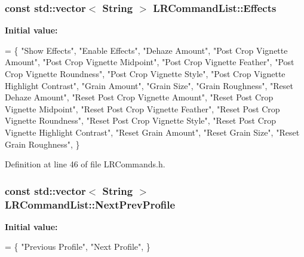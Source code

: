 \subsubsection[{\texorpdfstring{Effects}{Effects}}]{\setlength{\rightskip}{0pt plus 5cm}const std\+::vector$<$ String $>$ L\+R\+Command\+List\+::\+Effects\hspace{0.3cm}{\ttfamily [static]}}\hypertarget{class_l_r_command_list_a03a8a1a2c4063e93787410aef45838db}{}\label{class_l_r_command_list_a03a8a1a2c4063e93787410aef45838db}
{\bfseries Initial value\+:}
\begin{DoxyCode}
= \{
    \textcolor{stringliteral}{"Show Effects"},
    \textcolor{stringliteral}{"Enable Effects"},
    \textcolor{stringliteral}{"Dehaze Amount"},
    \textcolor{stringliteral}{"Post Crop Vignette Amount"},
    \textcolor{stringliteral}{"Post Crop Vignette Midpoint"},
    \textcolor{stringliteral}{"Post Crop Vignette Feather"},
    \textcolor{stringliteral}{"Post Crop Vignette Roundness"},
    \textcolor{stringliteral}{"Post Crop Vignette Style"},
    \textcolor{stringliteral}{"Post Crop Vignette Highlight Contrast"},
    \textcolor{stringliteral}{"Grain Amount"},
    \textcolor{stringliteral}{"Grain Size"},
    \textcolor{stringliteral}{"Grain Roughness"},
    \textcolor{stringliteral}{"Reset Dehaze Amount"},
    \textcolor{stringliteral}{"Reset Post Crop Vignette Amount"},
    \textcolor{stringliteral}{"Reset Post Crop Vignette Midpoint"},
    \textcolor{stringliteral}{"Reset Post Crop Vignette Feather"},
    \textcolor{stringliteral}{"Reset Post Crop Vignette Roundness"},
    \textcolor{stringliteral}{"Reset Post Crop Vignette Style"},
    \textcolor{stringliteral}{"Reset Post Crop Vignette Highlight Contrast"},
    \textcolor{stringliteral}{"Reset Grain Amount"},
    \textcolor{stringliteral}{"Reset Grain Size"},
    \textcolor{stringliteral}{"Reset Grain Roughness"},
\}
\end{DoxyCode}


Definition at line 46 of file L\+R\+Commands.\+h.

\subsubsection[{\texorpdfstring{Next\+Prev\+Profile}{NextPrevProfile}}]{\setlength{\rightskip}{0pt plus 5cm}const std\+::vector$<$ String $>$ L\+R\+Command\+List\+::\+Next\+Prev\+Profile\hspace{0.3cm}{\ttfamily [static]}}\hypertarget{class_l_r_command_list_af072ea5a2006a79eb3dd6d3e7a206086}{}\label{class_l_r_command_list_af072ea5a2006a79eb3dd6d3e7a206086}
{\bfseries Initial value\+:}
\begin{DoxyCode}
= \{
  \textcolor{stringliteral}{"Previous Profile"},
  \textcolor{stringliteral}{"Next Profile"},
\}
\end{DoxyCode}


